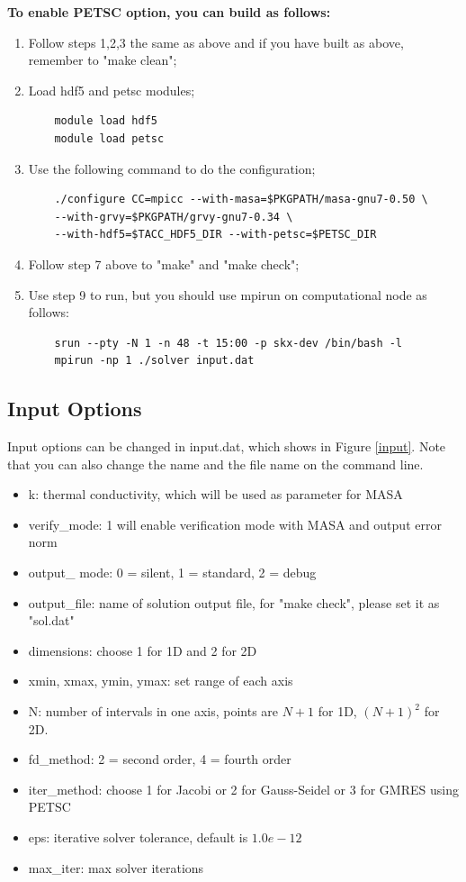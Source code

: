 \documentclass[a4paper]{article}
\begin{document}
\textbf{To enable PETSC option, you can build as follows:}
\begin{enumerate}
    \item Follow steps 1,2,3 the same as above and if you have built as above, remember to "make clean";
    \item Load hdf5 and petsc modules;
    \begin{verbatim}
    module load hdf5
    module load petsc
    \end{verbatim}
    \item Use the following command to do the configuration;
    \begin{verbatim}
    ./configure CC=mpicc --with-masa=$PKGPATH/masa-gnu7-0.50 \
    --with-grvy=$PKGPATH/grvy-gnu7-0.34 \
    --with-hdf5=$TACC_HDF5_DIR --with-petsc=$PETSC_DIR
    \end{verbatim}
    \item Follow step 7 above to "make" and "make check";
    \item Use step 9 to run, but you should use mpirun on computational node as follows:
    \begin{verbatim}
    srun --pty -N 1 -n 48 -t 15:00 -p skx-dev /bin/bash -l
    mpirun -np 1 ./solver input.dat
    \end{verbatim}
\end{enumerate}

\subsection{Input Options}
Input options can be changed in input.dat, which shows in Figure \ref{input}.
Note that you can also change the name and the file name on the command line.

\begin{itemize}
    \item k: thermal conductivity, which will be used as parameter for MASA
    \item verify\_mode: 1 will enable verification mode with MASA and output error norm
    \item output\_ mode: 0 = silent, 1 = standard, 2 = debug
    \item output\_file: name of solution output file, for "make check", please set it as "sol.dat"
    \item dimensions: choose 1 for 1D and 2 for 2D
    \item xmin, xmax, ymin, ymax: set range of each axis
    \item N: number of intervals in one axis, points are $N+1$ for 1D, $(N+1)^2$ for 2D.
    \item fd\_method: 2 = second order, 4 = fourth order
    \item iter\_method: choose 1 for Jacobi or 2 for Gauss-Seidel or 3 for GMRES using PETSC
    \item eps: iterative solver tolerance, default is $1.0e-12$
    \item max\_iter: max solver iterations
\end{itemize}
\end{document}
